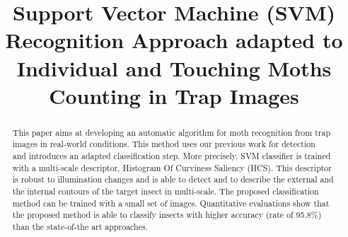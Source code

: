 \documentclass[a4paper,conference]{IEEEtran}
\begin{document}
%
\title{Support Vector Machine (SVM) Recognition Approach adapted to Individual and Touching Moths Counting in Trap Images}


%
\author{
}



\maketitle

\begin{abstract}
This paper aims at developing an automatic algorithm for moth recognition from trap images in real-world conditions. This method uses our previous work for detection~\cite{bakkay2017automatic} %
and introduces an adapted classification step. More precisely, SVM classifier is trained with a multi-scale descriptor, Histogram Of Curviness Saliency (HCS). This descriptor is robust to illumination changes and is able to detect and to describe the external and the internal contours of the target insect in multi-scale. The proposed classification method can be trained with a small set of images. Quantitative evaluations show that the proposed method is able to classify insects with higher accuracy (rate of 95.8\%) than the state-of-the art approaches.
\end{abstract}
\end{document}
